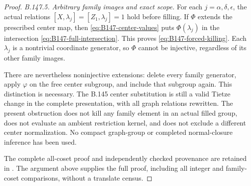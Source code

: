 \begin{proof}
\emph{B.147.5. Arbitrary family images and exact scope.}
For each $j=\alpha,\delta,\epsilon$, the actual relations
$[X,\lambda_j]=[Z_1,\lambda_j]=1$ hold before filling. If
$\Phi$ extends the prescribed center map, then
\eqref{eq:B147-center-values} puts $\Phi(\lambda_j)$ in the
intersection \eqref{eq:B147-full-intersection}. This proves
\eqref{eq:B147-forced-killing}. Each $\lambda_j$ is a nontrivial
coordinate generator, so $\Phi$ cannot be injective, regardless
of its other family images.

There are nevertheless noninjective extensions: delete every
family generator, apply $\varphi$ on the free center subgroup,
and include that subgroup again. This distinction is necessary.
The B.145 center substitution is still a valid Tietze change in
the complete presentation, with all graph relations rewritten.
The present obstruction does not kill any family element in an
actual filled group, does not evaluate an ambient restriction
kernel, and does not exclude a different center normalization.
No compact graph-group or completed normal-closure inference
has been used.

The complete all-coset proof and independently checked provenance
are retained in
.
The argument above supplies the full proof, including all integer
and family-coset comparisons, without a translate census.
\end{proof}
